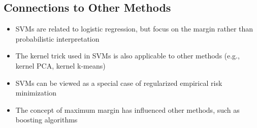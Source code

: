 \documentclass{article}
\begin{document}
\subsection{Connections to Other Methods}
\begin{itemize}
    \item SVMs are related to logistic regression, but focus on the margin rather than probabilistic interpretation
    \item The kernel trick used in SVMs is also applicable to other methods (e.g., kernel PCA, kernel k-means)
    \item SVMs can be viewed as a special case of regularized empirical risk minimization
    \item The concept of maximum margin has influenced other methods, such as boosting algorithms
\end{itemize}
\end{document}
